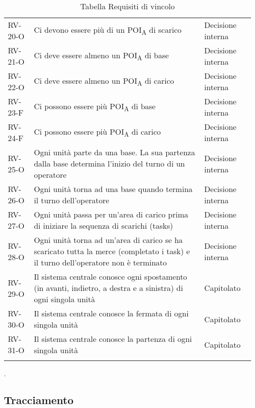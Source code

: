\begin{longtable}{ 
		>{}p{} 
		>{}p{}
		>{}p{} }
RV-20-O & Ci devono essere più di un \acrshort{POI}\textsubscript{A} di scarico & Decisione interna\tabularnewline
RV-21-O & Ci deve essere almeno un \acrshort{POI}\textsubscript{A} di base & Decisione interna\tabularnewline
RV-22-O & Ci deve essere almeno un \acrshort{POI}\textsubscript{A} di carico & Decisione interna\tabularnewline
RV-23-F & Ci possono essere più \acrshort{POI}\textsubscript{A} di base & Decisione interna\tabularnewline
RV-24-F & Ci possono essere più \acrshort{POI}\textsubscript{A} di carico & Decisione interna\tabularnewline
RV-25-O & Ogni unità parte da una base. La sua partenza dalla base determina l'inizio del turno di un operatore & Decisione interna\tabularnewline
RV-26-O & Ogni unità torna ad una base quando termina il turno dell’operatore & Decisione interna\tabularnewline
RV-27-O & Ogni unità passa per un’area di carico prima di iniziare la sequenza di scarichi (tasks) & Decisione interna\tabularnewline
RV-28-O & Ogni unità torna ad un'area di carico se ha scaricato tutta la merce (completato i task) e il turno dell’operatore non è terminato & Decisione interna\tabularnewline
RV-29-O & Il sistema centrale conosce ogni spostamento (in avanti, indietro, a destra e a sinistra) di ogni singola unità & Capitolato\tabularnewline
RV-30-O & Il sistema centrale conosce la fermata di ogni singola unità & Capitolato\tabularnewline
RV-31-O & Il sistema centrale conosce la partenza di ogni singola unità & Capitolato\tabularnewline
\caption{Tabella Requisiti di vincolo\label{ Tabella Requisiti di vincolo}}\\
\end{longtable}.
\pagebreak
\subsection{Tracciamento}
